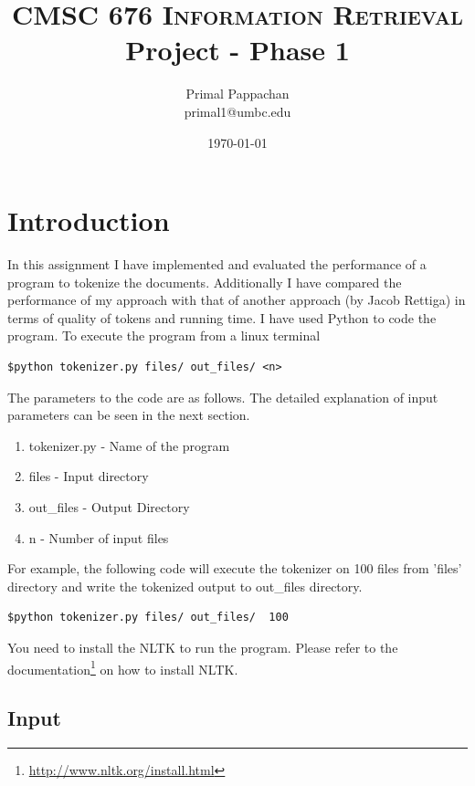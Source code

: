 \documentclass[11pt]{article} %
\title{\textsc{\LARGE CMSC 676 Information Retrieval} \\ Project - Phase 1 }
\author{Primal Pappachan \\ primal1@umbc.edu}
\date{{\large \today}}
\begin{document}
\maketitle


\section{Introduction} %

In this assignment I have implemented and evaluated the performance of a program to tokenize the documents. Additionally I have compared the performance of my approach with that of another approach (by Jacob Rettiga) in terms of quality of tokens and running time. I have used Python to code the program. To execute the program from a linux terminal 

\begin{verbatim}
$python tokenizer.py files/ out_files/ <n>
\end{verbatim}

The parameters to the code are as follows. The detailed explanation of input parameters can be seen in the next section.

\begin{enumerate}
\item tokenizer.py - Name of the program
\item files - Input directory
\item out\_files - Output Directory
\item n - Number of input files
\end{enumerate}

For example, the following code will execute the tokenizer on 100 files from 'files' directory and write the tokenized output to out\_files directory. 

\begin{verbatim}
$python tokenizer.py files/ out_files/  100
\end{verbatim}

You need to install the NLTK to run the program. Please refer to the documentation\footnote{\url{http://www.nltk.org/install.html}} on how to install NLTK.


\subsection{Input} %
\end{document}
